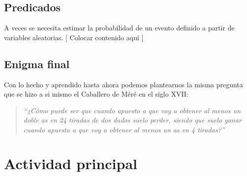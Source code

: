 \documentclass{article}
\begin{document}
\subsection{Predicados}

A veces se necesita estimar la probabilidad de un evento definido a partir de variables aleatorias. [ Colocar contenido aquí ]


\subsection{Enigma final}

Con lo hecho y aprendido hasta ahora podemos plantearnos la misma pregunta que se hizo a si mismo el Caballero de Méré en el siglo XVII: 

\begin{quotation}
\em``¿Cómo puede ser que cuando apuesto a que voy a obtener al menos un doble as en 24 tiradas de dos dados suelo perder, siendo que suelo ganar cuando apuesto a que voy a obtener al menos un as en 4 tiradas?''
\end{quotation}




\section{Actividad principal}
\end{document}
